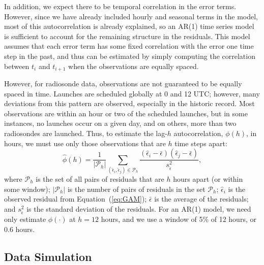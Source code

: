 \documentclass[12pt]{article}
\def\ni{\noindent}
\begin{document}
\begin{doublespacing}
In addition, we expect there to be temporal correlation in the error terms.  However, since we have already included hourly and seasonal terms in the model,  most of this autocorrelation is already explained, so an AR(1) time series model is sufficient to account for the remaining structure in the residuals.  This model assumes that each error term has some fixed correlation with the error one time step in the past, and thus can be estimated by simply computing the correlation between $t_i$ and $t_{i+1}$ when the observations are equally spaced.

However, for radiosonde data, observations are not guaranteed to be equally spaced in time.  Launches are scheduled globally at 0 and 12 UTC; however, many deviations from this pattern are observed, especially in the historic record.  Most observations are within an hour or two of the scheduled launches, but in some instances, no launches occur on a given day, and on others, more than two radiosondes are launched.   Thus, to estimate the lag-$h$  autocorrelation, ${\phi}(h)$, in hours, we must use only those observations that are $h$ time steps apart:
\begin{equation} \label{eq:ACF}
	\widehat{\phi}(h)=\frac{1}{\lvert \mathcal{P}_h\rvert} \sum_{(\hat{\epsilon}_i,\hat{\epsilon}_j) \in \mathcal{P}_h} \frac{(\hat{\epsilon}_i-\bar{\epsilon})(\hat{\epsilon}_j-\bar{\epsilon})}{s^2_{\hat\epsilon}},
\end{equation}
\ni where $\mathcal{P}_h$ is the set of all pairs of residuals that are $h$ hours apart (or within some window); $|\mathcal{P}_h|$ is the number of pairs of residuals in the set $\mathcal{P}_h$;  $\hat{\epsilon}_i$ is the observed residual from Equation~(\ref{eq:GAM}); $\bar\epsilon$ is the average of the residuals; and $s^2_{\hat\epsilon}$ is the standard deviation of the residuals.  For an AR(1) model, we need only estimate $\phi(\cdot)$ at $h=12$ hours, and we use a window of 5\% of 12 hours, or 0.6 hours.

\subsection{Data Simulation}
\label{ssec:sim}


\end{doublespacing}
\end{document}
